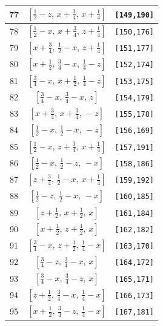 \documentclass[fleqn,8pt]{jsarticle}
\begin{document}
\begin{longtable}{ccc}
77 & $\left[ \frac{1}{2} - z,\, x + \frac{3}{4},\, x + \frac{1}{4} \right]$ & {\tt [149,190]} \\ \hline
78 & $\left[ \frac{1}{2} - x,\, x + \frac{3}{4},\, z + \frac{1}{4} \right]$ & {\tt [150,176]} \\ \hline
79 & $\left[ x + \frac{3}{4},\, \frac{1}{2} - x,\, z + \frac{1}{4} \right]$ & {\tt [151,177]} \\ \hline
80 & $\left[ x + \frac{1}{2},\, \frac{3}{4} - x,\, \frac{1}{4} - z \right]$ & {\tt [152,174]} \\ \hline
81 & $\left[ \frac{3}{4} - x,\, x + \frac{1}{2},\, \frac{1}{4} - z \right]$ & {\tt [153,175]} \\ \hline
82 & $\left[ \frac{3}{4} - x,\, \frac{3}{4} - x,\, z \right]$ & {\tt [154,179]} \\ \hline
83 & $\left[ x + \frac{3}{4},\, x + \frac{3}{4},\, - z \right]$ & {\tt [155,178]} \\ \hline
84 & $\left[ \frac{1}{2} - x,\, \frac{1}{2} - x,\, - z \right]$ & {\tt [156,169]} \\ \hline
85 & $\left[ \frac{1}{2} - x,\, z + \frac{3}{4},\, x + \frac{1}{4} \right]$ & {\tt [157,191]} \\ \hline
86 & $\left[ \frac{1}{2} - x,\, \frac{1}{2} - z,\, - x \right]$ & {\tt [158,186]} \\ \hline
87 & $\left[ z + \frac{3}{4},\, \frac{1}{2} - x,\, x + \frac{1}{4} \right]$ & {\tt [159,192]} \\ \hline
88 & $\left[ \frac{1}{2} - z,\, \frac{1}{2} - x,\, - x \right]$ & {\tt [160,185]} \\ \hline
89 & $\left[ z + \frac{1}{2},\, x + \frac{1}{2},\, x \right]$ & {\tt [161,184]} \\ \hline
90 & $\left[ x + \frac{1}{2},\, z + \frac{1}{2},\, x \right]$ & {\tt [162,182]} \\ \hline
91 & $\left[ \frac{3}{4} - x,\, z + \frac{1}{2},\, \frac{1}{4} - x \right]$ & {\tt [163,170]} \\ \hline
92 & $\left[ \frac{3}{4} - z,\, \frac{3}{4} - x,\, x \right]$ & {\tt [164,172]} \\ \hline
93 & $\left[ \frac{3}{4} - x,\, \frac{3}{4} - z,\, x \right]$ & {\tt [165,171]} \\ \hline
94 & $\left[ z + \frac{1}{2},\, \frac{3}{4} - x,\, \frac{1}{4} - x \right]$ & {\tt [166,173]} \\ \hline
95 & $\left[ x + \frac{1}{2},\, \frac{3}{4} - z,\, \frac{1}{4} - x \right]$ & {\tt [167,181]} \\ \hline

\end{longtable}
\end{document}
